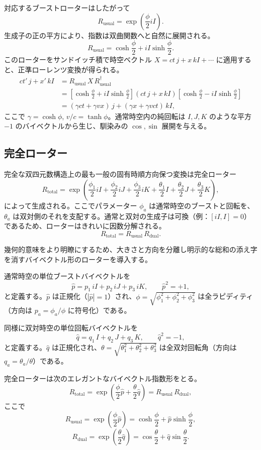 \documentclass[dvipdfmx,a4paper]{article}
\begin{document}
対応するブーストローターはしたがって
\[
R_\text{usual} = \exp\!\left( \frac{\phi}{2} iI \right).
\]
生成子の正の平方により、指数は双曲関数へと自然に展開される。
\[
R_\text{usual} = \cosh \frac{\phi}{2} + iI \sinh \frac{\phi}{2}.
\]
このローターをサンドイッチ積で時空ベクトル $X = ct \, j + x \, kI + \cdots$ に適用すると、正準ローレンツ変換が得られる。
\begin{align*}
ct' \, j + x' \, kI &= R_\text{usual} \, X \, R_\text{usual}^\dagger \\
&= \left[ \cosh\frac{\phi}{2} + iI \sinh\frac{\phi}{2} \right] (ct \, j + x \, kI) \left[ \cosh\frac{\phi}{2} - iI \sinh\frac{\phi}{2} \right] \\
&= (\gamma ct + \gamma v x) \, j + (\gamma x + \gamma v ct) \, kI,
\end{align*}
ここで $\gamma = \cosh \phi$, $v/c = \tanh \phi$。通常時空内の純回転は $I,J,K$ のような平方 $-1$ のバイベクトルから生じ、馴染みの $\cos,\sin$ 展開を与える。

\subsection{完全ローター}

完全な双四元数構造上の最も一般の固有時順方向保つ変換は完全ローター
\[
R_\text{total} = \exp\left( \frac{\phi_1}{2} iI + \frac{\phi_2}{2} iJ + \frac{\phi_3}{2} iK + \frac{\theta_1}{2} I + \frac{\theta_2}{2} J + \frac{\theta_3}{2} K \right),
\]
によって生成される。ここでパラメーター $\phi_a$ は通常時空のブーストと回転を、$\theta_a$ は双対側のそれを支配する。通常と双対の生成子は可換（例：$[iI, I] = 0$）であるため、ローターはきれいに因数分解される。
\[
R_\text{total} = R_\text{usual} \, R_\text{dual}.
\]

幾何的意味をより明瞭にするため、大きさと方向を分離し明示的な総和の添え字を消すバイベクトル形のローターを導入する。

通常時空の単位ブーストバイベクトルを
\[
\hat{p} = p_1 \, iI + p_2 \, iJ + p_3 \, iK, \qquad \hat{p}^2 = +1,
\]
と定義する。$\hat{p}$ は正規化（$|\hat{p}| = 1$）され、$\phi = \sqrt{\phi_1^2 + \phi_2^2 + \phi_3^2}$ は全ラピディティ（方向は $p_a = \phi_a / \phi$ に符号化）である。

同様に双対時空の単位回転バイベクトルを
\[
\hat{q} = q_1 \, I + q_2 \, J + q_3 \, K, \qquad \hat{q}^2 = -1,
\]
と定義する。$\hat{q}$ は正規化され、$\theta = \sqrt{\theta_1^2 + \theta_2^2 + \theta_3^2}$ は全双対回転角（方向は $q_a = \theta_a / \theta$）である。

完全ローターは次のエレガントなバイベクトル指数形をとる。
\[
R_\text{total} = \exp\!\left( \frac{\phi}{2} \hat{p} + \frac{\theta}{2} \hat{q} \right)
= R_\text{usual} \, R_\text{dual},
\]
ここで
\[
R_\text{usual} = \exp\!\left( \frac{\phi}{2} \hat{p} \right)
= \cosh\frac{\phi}{2} + \hat{p} \sinh\frac{\phi}{2},
\]
\[
R_\text{dual} = \exp\!\left( \frac{\theta}{2} \hat{q} \right)
= \cos\frac{\theta}{2} + \hat{q} \sin\frac{\theta}{2}.
\]
\end{document}
